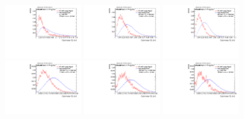 \begin{figure}
\includegraphics[width=0.3\textwidth]{sascha_input/Appendix/Distributions/w/distributions/beta2/h_recoJet_C2_2_bin1.pdf} \hspace{1mm}
\includegraphics[width=0.3\textwidth]{sascha_input/Appendix/Distributions/w/distributions/beta2/h_recoJet_C2_2_bin2.pdf} \hspace{1mm}
\includegraphics[width=0.3\textwidth]{sascha_input/Appendix/Distributions/w/distributions/beta2/h_recoJet_C2_2_bin3.pdf} 
\bigskip
\includegraphics[width=0.3\textwidth]{sascha_input/Appendix/Distributions/w/distributions/beta2/h_recoJet_C2_2_bin4.pdf} \hspace{1mm}
\includegraphics[width=0.3\textwidth]{sascha_input/Appendix/Distributions/w/distributions/beta2/h_recoJet_C2_2_bin5.pdf} \hspace{1mm}
\includegraphics[width=0.3\textwidth]{sascha_input/Appendix/Distributions/w/distributions/beta2/h_recoJet_C2_2_bin6.pdf}

\end{figure}
